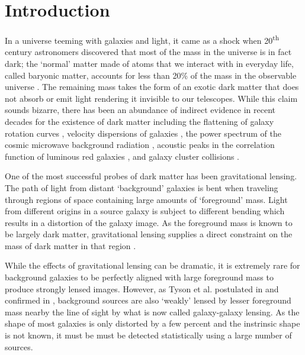 \documentclass[%
 reprint,
 amsmath,amssymb,
 aps,nofootinbib
]{revtex4-1}
\begin{document}
\maketitle



\section{Introduction}

In a universe teeming with galaxies and light, it came as a shock when 20\textsuperscript{th} century astronomers discovered that most of the mass in the universe is in fact dark; the `normal' matter made of atoms that we interact with in everyday life, called baryonic matter, accounts for less than 20\% of the mass in the observable universe \cite{planck_2015}. The remaining mass takes the form of an exotic dark matter that does not absorb or emit light rendering it invisible to our telescopes. While this claim sounds bizarre, there has been an abundance of indirect evidence in recent decades for the existence of dark matter including the flattening of galaxy rotation curves \cite{rotation_curve}, velocity dispersions of galaxies \cite{zwicky}, the power spectrum of the cosmic microwave background radiation \cite{planck_2015}, acoustic peaks in the correlation function of luminous red galaxies \cite{bao_detection}, and galaxy cluster collisions \cite{bullet_cluster}.

One of the most successful probes of dark matter has been gravitational lensing. The path of light from distant `background' galaxies is bent when traveling through regions of space containing large amounts of `foreground' mass. Light from different origins in a source galaxy is subject to different bending which results in a distortion of the galaxy image. As the foreground mass is known to be largely dark matter, gravitational lensing supplies a direct constraint on the mass of dark matter in that region \cite{dark_matter_probe}.

While the effects of gravitational lensing can be dramatic, it is extremely rare for background galaxies to be perfectly aligned with large foreground mass to produce strongly lensed images. However, as Tyson et al. postulated in \cite{tyson_postulate} and confirmed in \cite{tyson_confirm}, background sources are also `weakly' lensed by lesser foreground mass nearby the line of sight by what is now called galaxy-galaxy lensing. As the shape of most galaxies is only distorted by a few percent and the instrinsic shape is not known, it must be must be detected statistically using a large number of sources.
\end{document}
